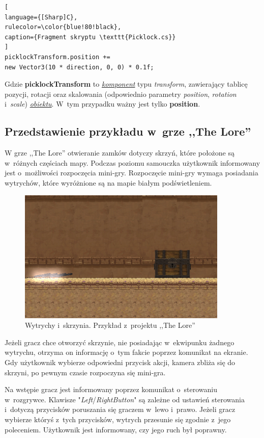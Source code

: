 \documentclass[oneside,polski,logo]{amuthesis}
\begin{document}
\begin{lstlisting}[
language={[Sharp]C},
rulecolor=\color{blue!80!black},
caption={Fragment skryptu \texttt{Picklock.cs}}
]
picklockTransform.position += 
new Vector3(10 * direction, 0, 0) * 0.1f;
\end{lstlisting}

Gdzie \textbf{picklockTransform} to \hyperref[sec:komponent]{\emph{komponent}} typu \emph{transform}, zawierający tablicę pozycji, rotacji oraz skalowania (odpowiednio parametry \emph{position}, \emph{rotation} i~\emph{scale}) \hyperref[sec:gameobject]{\emph{obiektu}}. W~tym przypadku ważny jest tylko \textbf{position}. 

\subsection{Przedstawienie przykładu w~grze ,,The Lore''}
W grze ,,The Lore'' otwieranie zamków dotyczy skrzyń, które położone są w~różnych częściach mapy. Podczas poziomu samouczka użytkownik informowany jest o~możliwości rozpoczęcia mini-gry. Rozpoczęcie mini-gry wymaga posiadania wytrychów, które wyróżnione są na mapie białym podświetleniem.


\begin{figure}[h]
	\centering
	\includegraphics[width=10cm]{images/tyrek/skrzynia.png}
	\caption{Wytrychy i~skrzynia. Przykład z~projektu ,,The Lore''}
\end{figure}

Jeżeli gracz chce otworzyć skrzynie, nie posiadając w~ekwipunku żadnego wytrychu, otrzyma on informację o~tym fakcie poprzez komunikat na ekranie. Gdy użytkownik wybierze odpowiedni przycisk akcji, kamera zbliża się do skrzyni, po pewnym czasie rozpoczyna się mini-gra.

Na wstępie gracz jest informowany poprzez komunikat o~sterowaniu w~rozgrywce. Klawisze "\emph{Left}/\emph{RightButton}" są zależne od ustawień sterowania i~dotyczą przycisków poruszania się graczem w~lewo i~prawo. Jeżeli gracz wybierze któryś z~tych przycisków, wytrych przesunie się zgodnie z~jego poleceniem. Użytkownik jest informowany, czy jego ruch był poprawny.
\end{document}
